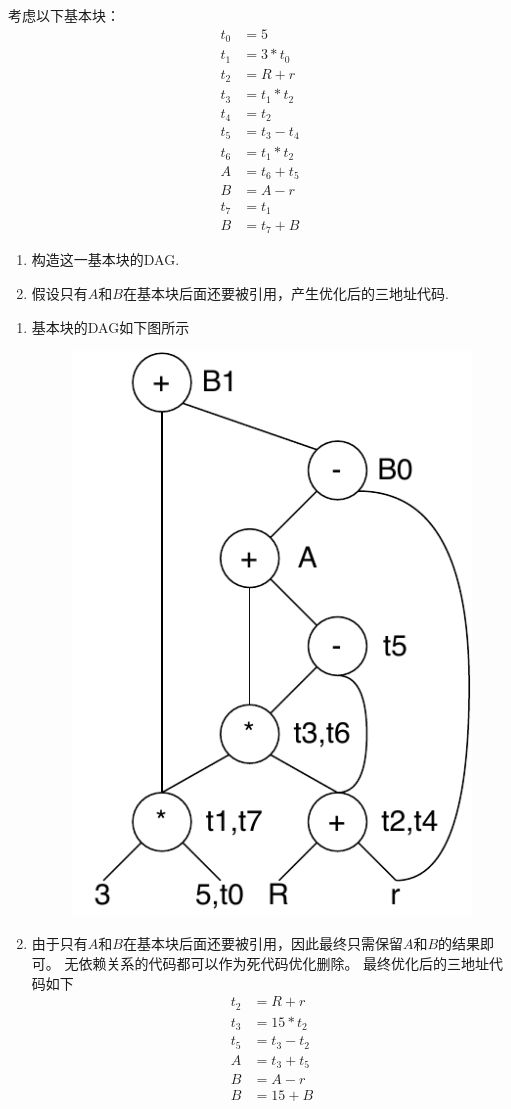 \begin{example}
考虑以下基本块：
\[\begin{aligned}
t_0 &= 5\\
t_1 &= 3 * t_0\\
t_2 &= R + r\\
t_3 &= t_1 * t_2\\
t_4 &= t_2\\
t_5 &= t_3 - t_4\\
t_6 &= t_1 * t_2\\
A   &= t_6 + t_5\\
B   &= A - r\\
t_7 &= t_1\\
B   &= t_7 + B
\end{aligned}\]
\begin{enumerate}
\item 构造这一基本块的DAG.
\item 假设只有$A$和$B$在基本块后面还要被引用，产生优化后的三地址代码.
\end{enumerate}
\end{example}
\begin{analysis}
\begin{enumerate}
	\item 基本块的DAG如下图所示
	\begin{figure}[H]
	\centering
	\includegraphics[width=0.3\linewidth]{fig/dag-1.pdf}
	\end{figure}
	\item 由于只有$A$和$B$在基本块后面还要被引用，因此最终只需保留$A$和$B$的结果即可。
	无依赖关系的代码都可以作为死代码优化删除。
	最终优化后的三地址代码如下
\[\begin{aligned}
t_2 &= R + r\\
t_3 &= 15 * t_2\\
t_5 &= t_3 - t_2\\
A &= t_3 + t_5\\
B &= A - r\\
B &= 15 + B
\end{aligned}\]
\end{enumerate}
\end{analysis}

